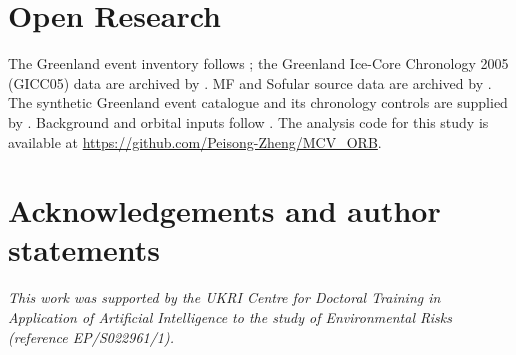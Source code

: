 \documentclass[11pt]{article}
\begin{document}
\section*{Open Research}
The Greenland event inventory follows \citet{rasmussen2014stratigraphic}; the Greenland Ice-Core Chronology 2005 (GICC05) data are archived by \citet{rasmussen2022gicc05}. MF and Sofular source data are archived by \citet{fohlmeister2023mfData,held2024sofularData}. The synthetic Greenland event catalogue and its chronology controls are supplied by \citet{barker2011800}. Background and orbital inputs follow \citet{lisiecki2005pliocene,bereiter2015revision,laskar2004long}. The analysis code for this study is available at \url{https://github.com/Peisong-Zheng/MCV_ORB}.

\section*{Acknowledgements and author statements}
\emph{This work was supported by the UKRI Centre for Doctoral Training in Application of Artificial Intelligence to the study of Environmental Risks (reference EP/S022961/1).}



\end{document}
